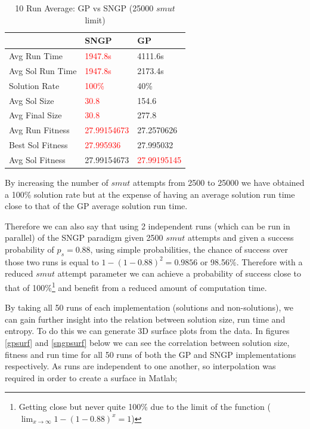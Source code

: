 \documentclass[a4paper,10.5pt]{article}
\begin{document}
\begin{table}[H]
\caption{10 Run Average: GP vs SNGP (25000 $smut$ limit)}
\centering
    \begin{tabular}{l|l|l}
    ~                 & SNGP           & GP             \\ \hline
    Avg Run Time      &    \textcolor{red}{1947.8s} &    4111.6s \\
    Avg Sol Run Time  & \textcolor{red}{1947.8s}    & 2173.4s   \\
    Solution Rate     & \textcolor{red}{100\%}           & 40\%           \\
    Avg Sol Size & \textcolor{red}{30.8} & 154.6          \\
    Avg Final Size  & \textcolor{red}{30.8}        & 277.8          \\
    Avg Run Fitness   & \textcolor{red}{ 27.99154673}    &  27.2570626    \\
    Best Sol Fitness  & \textcolor{red}{27.995936}      & 27.995032      \\
    Avg Sol Fitness   & 27.99154673    & \textcolor{red}{27.99195145}    \\
    \end{tabular}
\label{25000}
\end{table}

By increasing the number of $smut$ attempts from 2500 to 25000 we have obtained a 100\% solution rate but at the expense of having an average solution run time close to that of the GP average solution run time.

Therefore we can also say that using 2 independent runs (which can be run in parallel) of the SNGP paradigm given 2500 $smut$ attempts and given a success probability of $p_s = 0.88$, using simple probabilities, the chance of success over those two runs is equal to $1 - (1 - 0.88)^{2} = 0.9856$ or 98.56\%.  Therefore with a reduced $smut$ attempt parameter we can achieve a probability of success close to that of 100\%\footnote{Getting close but never quite 100\% due to the limit of the function ($\lim_{x \to \infty} 1 - (1 - 0.88)^{x} = 1$)} and benefit from a reduced amount of computation time.

By taking all 50 runs of each implementation (solutions and non-solutions), we can gain further insight into the relation between solution size, run time and entropy. To do this we can generate 3D surface plots from the data. In figures \ref{gpsurf} and \ref{sngpsurf} below we can see the correlation between solution size, fitness and run time for all 50 runs of both the GP and SNGP implementations respectively. As runs are independent to one another, so interpolation was required in order to create a surface in Matlab;
\end{document}

